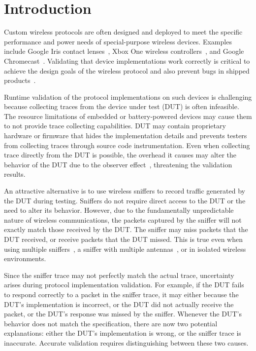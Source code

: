 \section{Introduction}
\label{sec:intro}

Custom wireless protocols are often designed and deployed to meet the specific
performance and power needs of special-purpose wireless devices. Examples
include Google
Iris contact lenses~\cite{iris}, Xbox One wireless controllers~\cite{xbox}, and
Google Chromecast~\cite{chromecast}. Validating that device implementations work
correctly is critical to achieve the design goals of the wireless protocol and
also prevent bugs in shipped products~\cite{wifried,lollipop,surface}.


Runtime validation of the protocol implementations on such devices is
challenging because collecting traces from the device under test (DUT) is often
infeasible. The resource limitations of embedded or battery-powered devices may
cause them to not provide trace collecting capabilities. DUT may contain
proprietary hardware or firmware that hides the implementation details and
prevents testers from collecting traces through source code instrumentation.
Even when collecting trace directly from the DUT is possible, the overhead it causes
may alter the behavior of the DUT due to the observer
effect~\cite{mytkowicz2008observer}, threatening the validation results.

An attractive alternative is to use wireless
sniffers to record traffic generated by the DUT during testing.
Sniffers do not require direct access to the DUT or the need to alter its behavior.
However, due to the fundamentally unpredictable nature of wireless
communications, the packets captured by the sniffer will not exactly match
those received by the DUT.
The sniffer may miss packets that the DUT received, or receive packets that
the DUT missed.
This is true even when using multiple
sniffers~\cite{cheng2006jigsaw,mahajan2006analyzing,bahl2006enhancing}, a sniffer
with multiple antennas~\cite{omnipeek}, or in isolated wireless environments.

Since the sniffer trace may not perfectly match the actual trace, uncertainty
arises during protocol implementation validation.  For example, if the DUT fails
to respond correctly to a packet in the sniffer trace, it may either because the
DUT's implementation is incorrect, or the DUT did not actually receive the
packet, or the DUT's response was missed by the sniffer.  Whenever the DUT's
behavior does not match the specification, there are now two potential
explanations: either the DUT's implementation is wrong, or the sniffer trace is
inaccurate. Accurate validation requires  distinguishing between these two
causes.

